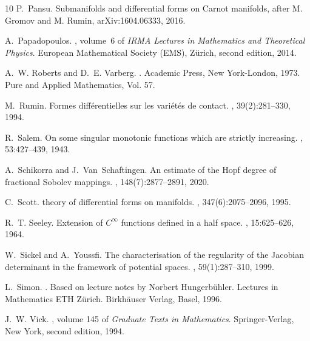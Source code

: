 \documentclass[intlimits,12pt,reqno]{amsart}
\numberwithin{equation}{section}
\theoremstyle{definition}
\begin{document}
\begin{thebibliography}{10}
P.~Pansu.
\newblock Submanifolds and differential forms on Carnot manifolds, after M. Gromov and M. Rumin, 
arXiv:1604.06333, 2016.

A.~Papadopoulos.
, volume~6
  of {\em IRMA Lectures in Mathematics and Theoretical Physics}.
\newblock European Mathematical Society (EMS), Z\"{u}rich, second edition,
  2014.

A.~W. Roberts and D.~E. Varberg.
.
\newblock Academic Press, New York-London, 1973.
\newblock Pure and Applied Mathematics, Vol. 57.

M.~Rumin.
\newblock Formes diff\'{e}rentielles sur les vari\'{e}t\'{e}s de contact.
, 39(2):281--330, 1994.

R.~Salem.
\newblock On some singular monotonic functions which are strictly increasing.
, 53:427--439, 1943.

A.~Schikorra and J.~Van~Schaftingen.
\newblock An estimate of the {H}opf degree of fractional {S}obolev mappings.
, 148(7):2877--2891, 2020.

C.~Scott.
 theory of differential forms on manifolds.
, 347(6):2075--2096, 1995.

R.~T. Seeley.
\newblock Extension of {$C^{\infty }$} functions defined in a half space.
, 15:625--626, 1964.

W.~Sickel and A.~Youssfi.
\newblock The characterisation of the regularity of the {J}acobian determinant
  in the framework of potential spaces.
, 59(1):287--310, 1999.

L.~Simon.
.
\newblock Based on lecture notes by Norbert Hungerb\"{u}hler.
\newblock Lectures in Mathematics ETH Z\"{u}rich. Birkh\"{a}user Verlag, Basel,
  1996.



J.~W. Vick.
, volume 145 of {\em Graduate Texts in
  Mathematics}.
\newblock Springer-Verlag, New York, second edition, 1994.



\end{thebibliography}
\end{document}

